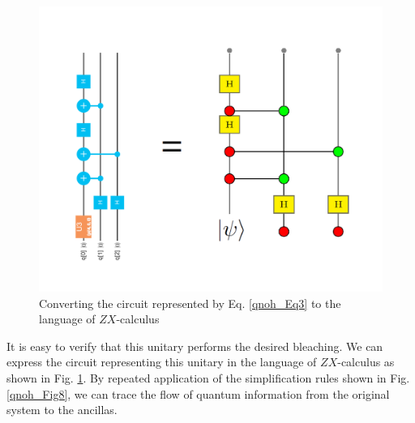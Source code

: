 \begin{figure}
\centering
\includegraphics[scale=.25]{qnoh_Fig6}
\caption{Converting the circuit represented by Eq. \eqref{qnoh_Eq3} to the language of $ZX$-calculus}
\label{qnoh_zx}
\end{figure}

It is easy to verify that this unitary performs the desired bleaching. We can express the circuit representing this unitary in the language of $ZX$-calculus as shown in Fig. \ref{qnoh_zx}. By repeated application of the simplification rules shown in Fig. \ref{qnoh_Fig8}, we can trace the flow of quantum information from the original system to the ancillas.

\clearpage

